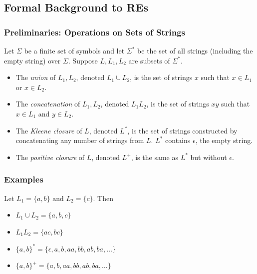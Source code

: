 \subsection{Formal Background to REs}

\begin{frame}[fragile]
  \frametitle{Preliminaries: Operations on Sets of Strings}

    Let $\Sigma$ be a finite set of symbols and let $\Sigma^*$ be the set
    of all strings (including the empty string) over $\Sigma$. Suppose
    $L, L_{1}, L_{2}$ are subsets of $\Sigma^*$.

  \begin{itemize}
  
    \item The \textit{union} of $L_{1}, L_{2}$,
      denoted $L_{1}\cup L_{2}$,  is the set of
      strings $x$ such that
      $x \in L_{1}$ or $x \in L_{2}$.
   \item The \textit{concatenation} of $L_{1}, L_{2}$,
      denoted $L_{1}L_{2}$,  is the set of
      strings $xy$ such that
      $x \in L_{1}$ and $y \in L_{2}$.
    \item The \textit{Kleene closure} of $L$, denoted $L^*$, is the set of
      strings constructed by concatenating any number of strings from
      $L$. $L^*$ contains $\epsilon$, the empty string.
    \item The \textit{positive closure} of $L$, denoted $L^+$, is the same as
      $L^*$ but without $\epsilon$.

  \end{itemize}
\end{frame}

\begin{frame}[fragile]
  \frametitle{Examples}

Let $L_1 = \{a, b\} \text{ and } L_2 = \{c\}$. Then
\begin{itemize}
  \item $L_{1}\cup L_{2} = \{a, b, c\}$
  \item $L_{1}L_{2} = \{ac, bc\}$
  \item $\{a, b\}^* = \{\epsilon, a, b, aa, bb, ab, ba, \ldots\}$
  \item $\{a, b\}^+ = \{a, b, aa, bb, ab, ba, \ldots\}$
\end{itemize}
\end{frame}

